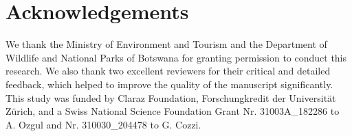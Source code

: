 \documentclass[abstract=on,10pt,a4paper,bibliography=totocnumbered]{article}
\begin{document}
\section{Acknowledgements}
We thank the Ministry of Environment and Tourism and the Department of Wildlife
and National Parks of Botswana for granting permission to conduct this research.
We also thank two excellent reviewers for their critical and detailed feedback,
which helped to improve the quality of the manuscript significantly. This study
was funded by Claraz Foundation, Forschungkredit der Universität Zürich, and a
Swiss National Science Foundation Grant Nr. 31003A\_182286 to A. Ozgul and Nr.
310030\_204478 to G. Cozzi.

\newpage
\begingroup
\singlespacing
{}
\endgroup
\end{document}

